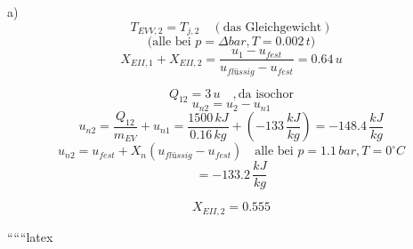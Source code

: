 a) 
\[
T_{EVV,2} = T_{j,2} \quad (\text{das Gleichgewicht})
\]
\[
\text{(alle bei } p = \Delta bar, T = 0.002 \, t)
\]
\[
X_{EII,1} + X_{EII,2} = \frac{u_{1} - u_{fest}}{u_{flüssig} - u_{fest}} = 0.64 \, u
\]

\[
Q_{12} = 3 \, u \quad , \text{da isochor}
\]
\[
u_{n2} = u_{2} - u_{n1}
\]
\[
u_{n2} = \frac{Q_{12}}{m_{EV}} + u_{n1} = \frac{1500 \, kJ}{0.16 \, kg} + (-133 \, \frac{kJ}{kg}) = -148.4 \, \frac{kJ}{kg}
\]
\[
u_{n2} = u_{fest} + X_{n} (u_{flüssig} - u_{fest}) \quad \text{alle bei } p = 1.1 \, bar, T = 0^{\circ}C
\]
\[
= -133.2 \, \frac{kJ}{kg}
\]

\[
X_{EII,2} = 0.555
\]

``````latex
